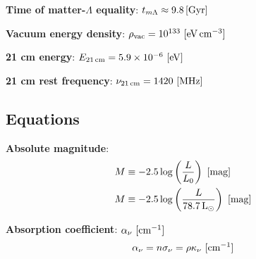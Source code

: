 \documentclass[a4paper,11pt]{article}
\begin{document}
{\noindent}\textbf{Time of matter-$\Lambda$ equality}: $t_{m\Lambda}
\approx9.8\,[{\rm Gyr}]$

{\noindent}\textbf{Vacuum energy density}: $\rho_\mathrm{vac} = 10^{133} ~ [{\rm eV\,cm^{-3}}]$

{\noindent}\textbf{21 cm energy}: $E_{21\,\mathrm{cm}} = 5.9\times10^{-6} ~ [{\rm eV}]$

{\noindent}\textbf{21 cm rest frequency}: $\nu_{21\,\mathrm{cm}} = 1420 ~ [{\rm MHz}]$







































\newpage
\subsection{Equations}

{\noindent}\textbf{Absolute magnitude}:
\begin{align*}
    M &\equiv -2.5\log\left(\frac{L}{L_0}\right) ~ [{\rm mag}] \\
    M &\equiv -2.5\log\left(\frac{L}{78.7\,{\rm L_\odot}}\right) ~ [{\rm mag}]
\end{align*}

{\noindent}\textbf{Absorption coefficient}: $\alpha_\nu ~ [{\rm cm^{-1}}]$
\begin{align*}
    \alpha_\nu = n\sigma_\nu = \rho\kappa_\nu ~ [{\rm cm^{-1}}]
\end{align*}
\end{document}
